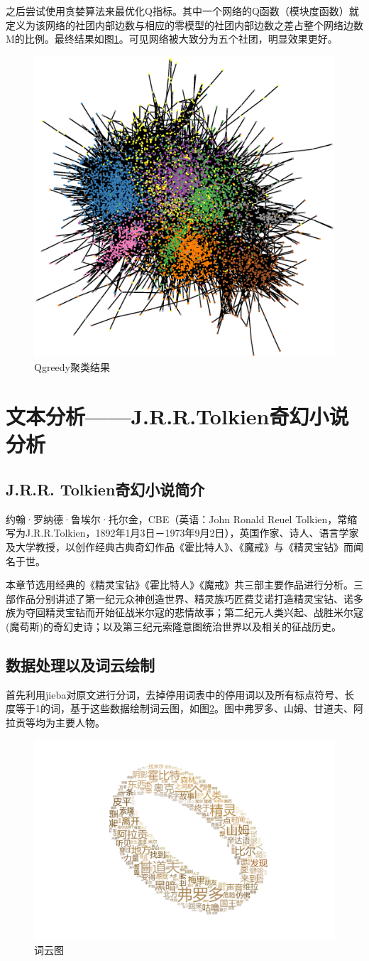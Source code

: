 \documentclass[10pt, a4paper]{article}
\begin{document}
之后尝试使用贪婪算法来最优化Q指标。其中一个网络的Q函数（模块度函数）就定义为该网络的社团内部边数与相应的零模型的社团内部边数之差占整个网络边数M的比例。最终结果如图\ref{fig:Qgreedy}。可见网络被大致分为五个社团，明显效果更好。
\begin{figure}[tbph!]
	\centering
	\includegraphics[width=0.5\linewidth]{figures/Qgreedy聚类结果}
	\caption{Qgreedy聚类结果}
	\label{fig:Qgreedy}
\end{figure}

\section{文本分析——J.R.R.Tolkien奇幻小说分析}
\subsection{J.R.R. Tolkien奇幻小说简介}

约翰·罗纳德·鲁埃尔·托尔金，CBE（英语：John Ronald Reuel Tolkien，常缩写为J.R.R.Tolkien，1892年1月3日－1973年9月2日），英国作家、诗人、语言学家及大学教授，以创作经典古典奇幻作品《霍比特人》、《魔戒》与《精灵宝钻》而闻名于世。\cite{Tolkien}

本章节选用经典的《精灵宝钻》《霍比特人》《魔戒》共三部主要作品进行分析。三部作品分别讲述了第一纪元众神创造世界、精灵族巧匠费艾诺打造精灵宝钻、诺多族为夺回精灵宝钻而开始征战米尔寇的悲情故事；第二纪元人类兴起、战胜米尔寇(魔苟斯)的奇幻史诗；以及第三纪元索隆意图统治世界以及相关的征战历史。

\subsection{数据处理以及词云绘制}

首先利用jieba对原文进行分词，去掉停用词表中的停用词以及所有标点符号、长度等于1的词，基于这些数据绘制词云图，如图\ref{fig:词云图}。图中弗罗多、山姆、甘道夫、阿拉贡等均为主要人物。
\begin{figure}[tbph!]
	\centering
	\includegraphics[width=0.5\linewidth]{figures/词云}
	\caption{词云图}
	\label{fig:词云图}
\end{figure}
\end{document}
